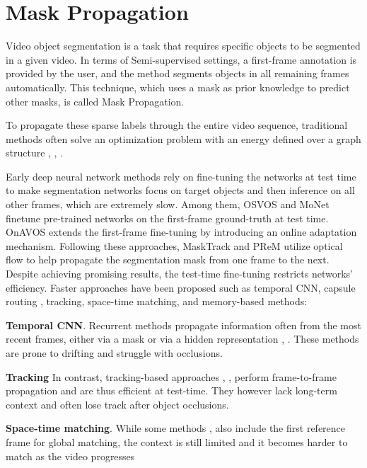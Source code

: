 \section{Mask Propagation}
\label{sec:mask_propagate}

Video object segmentation is a task that requires specific objects to be segmented in a given video. In terms of Semi-supervised settings, a first-frame annotation is provided by the user, and the method segments objects in all remaining frames automatically. This technique, which uses a mask as prior knowledge to predict other masks, is called Mask Propagation.

To propagate these sparse labels through the entire video sequence, traditional methods often solve an optimization problem with an energy defined over a graph structure \cite{badrinarayanan2010label}, \cite{vijayanarasimhan2012active}, \cite{avinash2014seamseg}.

Early deep neural network methods rely on fine-tuning the networks at test time to make segmentation networks focus on target objects and then inference on all other frames, which are extremely slow. Among them, OSVOS \cite{caelles2017one} and MoNet \cite{xiao2018monet} finetune pre-trained networks on the first-frame ground-truth at test time. OnAVOS \cite{voigtlaender2017online} extends the first-frame fine-tuning by introducing an online adaptation mechanism. Following these approaches, MaskTrack \cite{perazzi2017learning} and PReM \cite{luiten2018premvos} utilize optical flow to help propagate the segmentation mask from one frame to the next. Despite achieving promising results, the test-time fine-tuning restricts networks’ efficiency. 
Faster approaches have been proposed such as temporal CNN, capsule routing \cite{duarte2019capsulevos}, tracking, space-time matching, and memory-based methods:

\textbf{Temporal CNN}. Recurrent methods propagate information often from the most recent frames, either via a mask \cite{perazzi2017learning} or via a hidden representation \cite{ventura2019rvos}, \cite{hu2017maskrnn}. These methods are prone to drifting and struggle with occlusions.

\textbf{Tracking}
In contrast, tracking-based approaches \cite{jang2017online}, \cite{wang2019fast}, \cite{chen2020state} perform
frame-to-frame propagation and are thus efficient at test-time. They however lack long-term context and often lose track after object occlusions.

\textbf{Space-time matching}. While some methods \cite{huang2020fast}, \cite{voigtlaender2019feelvos} \cite{yang2020collaborative} also include the first reference frame for global matching, the context is still limited and it becomes harder to match as the video progresses


